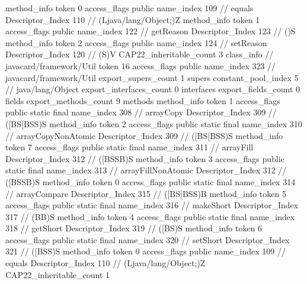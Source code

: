 {{{{{				}
				method_info {
					token	0
					access_flags	public
					name_index	109		// equals
					Descriptor_Index	110		// (Ljava/lang/Object;)Z
				}
				method_info {
					token	1
					access_flags	public
					name_index	122		// getReason
					Descriptor_Index	123		// ()S
				}
				method_info {
					token	2
					access_flags	public
					name_index	124		// setReason
					Descriptor_Index	120		// (S)V
				}
			}
			CAP22_inheritable_count	3
		}
		class_info {		// javacard/framework/Util
			token	16
			access_flags	public
			name_index	323		// javacard/framework/Util
			export_supers_count	1
			supers {
				constant_pool_index	5		// java/lang/Object
			}
			export_interfaces_count	0
			interfaces {
			}
			export_fields_count	0
			fields {
			}
			export_methods_count	9
			methods {
				method_info {
					token	1
					access_flags	public static final
					name_index	308		// arrayCopy
					Descriptor_Index	309		// ([BS[BSS)S
				}
				method_info {
					token	2
					access_flags	public static final
					name_index	310		// arrayCopyNonAtomic
					Descriptor_Index	309		// ([BS[BSS)S
				}
				method_info {
					token	7
					access_flags	public static final
					name_index	311		// arrayFill
					Descriptor_Index	312		// ([BSSB)S
				}
				method_info {
					token	3
					access_flags	public static final
					name_index	313		// arrayFillNonAtomic
					Descriptor_Index	312		// ([BSSB)S
				}
				method_info {
					token	0
					access_flags	public static final
					name_index	314		// arrayCompare
					Descriptor_Index	315		// ([BS[BSS)B
				}
				method_info {
					token	5
					access_flags	public static final
					name_index	316		// makeShort
					Descriptor_Index	317		// (BB)S
				}
				method_info {
					token	4
					access_flags	public static final
					name_index	318		// getShort
					Descriptor_Index	319		// ([BS)S
				}
				method_info {
					token	6
					access_flags	public static final
					name_index	320		// setShort
					Descriptor_Index	321		// ([BSS)S
				}
				method_info {
					token	0
					access_flags	public
					name_index	109		// equals
					Descriptor_Index	110		// (Ljava/lang/Object;)Z
				}
			}
			CAP22_inheritable_count	1
		}
	}
}
